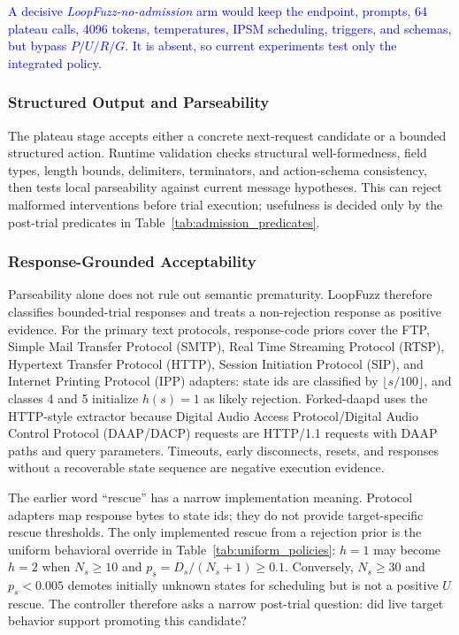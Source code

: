 \documentclass[final,5p,times,number]{elsarticle}
\begin{document}
\textcolor{blue}{A decisive \emph{LoopFuzz-no-admission} arm would keep the endpoint, prompts, 64 plateau calls, 4096 tokens, temperatures, IPSM scheduling, triggers, and schemas, but bypass $P/U/R/G$. It is absent, so current experiments test only the integrated policy.}

\subsubsection{Structured Output and Parseability}
The plateau stage accepts either a concrete next-request candidate or a bounded structured action. Runtime validation checks structural well-formedness, field types, length bounds, delimiters, terminators, and action-schema consistency, then tests local parseability against current message hypotheses. This can reject malformed interventions before trial execution; usefulness is decided only by the post-trial predicates in Table~\ref{tab:admission_predicates}.

\subsubsection{Response-Grounded Acceptability}
Parseability alone does not rule out semantic prematurity. LoopFuzz therefore classifies bounded-trial responses and treats a non-rejection response as positive evidence. For the primary text protocols, response-code priors cover the FTP, Simple Mail Transfer Protocol (SMTP), Real Time Streaming Protocol (RTSP), Hypertext Transfer Protocol (HTTP), Session Initiation Protocol (SIP), and Internet Printing Protocol (IPP) adapters: state ids are classified by $\lfloor s/100\rfloor$, and classes 4 and 5 initialize $h(s)=1$ as likely rejection. Forked-daapd uses the HTTP-style extractor because Digital Audio Access Protocol/Digital Audio Control Protocol (DAAP/DACP) requests are HTTP/1.1 requests with DAAP paths and query parameters. Timeouts, early disconnects, resets, and responses without a recoverable state sequence are negative execution evidence.

The earlier word ``rescue'' has a narrow implementation meaning. Protocol adapters map response bytes to state ids; they do not provide target-specific rescue thresholds. The only implemented rescue from a rejection prior is the uniform behavioral override in Table~\ref{tab:uniform_policies}: $h=1$ may become $h=2$ when $N_s\ge10$ and $p_s=D_s/(N_s+1)\ge0.1$. Conversely, $N_s\ge30$ and $p_s<0.005$ demotes initially unknown states for scheduling but is not a positive $U$ rescue. The controller therefore asks a narrow post-trial question: did live target behavior support promoting this candidate?
\end{document}
